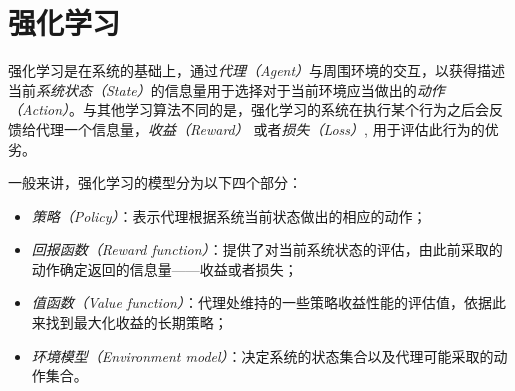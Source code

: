 ﻿\documentclass[11pt,draftclsnofoot,onecolumn,journal,letterpaper]{IEEEtran}
\begin{document}
\section{强化学习}
\label{sec:RL}

%
%
%


强化学习是在系统的基础上，通过\emph{代理（Agent）}与周围环境的交互，以获得描述当前\emph{系统状态（State）}的信息量用于选择对于当前环境应当做出的\emph{动作（Action）}。与其他学习算法不同的是，强化学习的系统在执行某个行为之后会反馈给代理一个信息量，\emph{收益（Reward）} 或者\emph{损失（Loss）}, 用于评估此行为的优劣\cite{Sutton1998}。

一般来讲，强化学习的模型分为以下四个部分：
\begin{itemize}
\item \emph{策略（Policy）}：表示代理根据系统当前状态做出的相应的动作；
\item \emph{回报函数（Reward function）}：提供了对当前系统状态的评估，由此前采取的动作确定返回的信息量——收益或者损失；
\item \emph{值函数（Value function）}：代理处维持的一些策略收益性能的评估值，依据此来找到最大化收益的长期策略；
\item \emph{环境模型（Environment model）}：决定系统的状态集合以及代理可能采取的动作集合。
\end{itemize}
\end{document}
